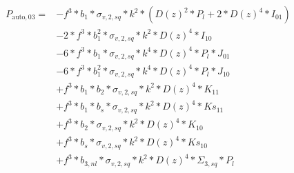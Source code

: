 \documentclass{article}
\begin{document}
\begin{equation}
\begin{aligned}  
P_{\mathrm{auto},03}=&-f^{3}*b_{1}*\sigma_{v,2,sq}*k^{2}*(D(z)^{2}*P_l + 2*D(z)^{4}*I_{01}) \\
&-2*f^{3}*b_{1}^{2}*\sigma_{v,2,sq}*k^{2}*D(z)^{4}*I_{10} \\
&-6*f^{3}*b_{1}*\sigma_{v,2,sq}*k^{4}*D(z)^{4}*P_l*J_{01} \\
&-6*f^{3}*b_{1}^{2}*\sigma_{v,2,sq}*k^{4}*D(z)^{4}*P_l*J_{10} \\
&+f^{3}*b_{1}*b_{2}*\sigma_{v,2,sq}*k^{2}*D(z)^{4}*K_{11} \\
&+f^{3}*b_{1}*b_{s}*\sigma_{v,2,sq}*k^{2}*D(z)^{4}*Ks_{11} \\
&+f^{3}*b_{2}*\sigma_{v,2,sq}*k^{2}*D(z)^{4}*K_{10} \\
&+f^{3}*b_{s}*\sigma_{v,2,sq}*k^{2}*D(z)^{4}*Ks_{10} \\
&+f^{3}*b_{3,nl}*\sigma_{v,2,sq}*k^{2}*D(z)^{4}*\Sigma_{3,sq}*P_l \\
\end{aligned}
\end{equation}
\end{document}
